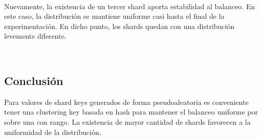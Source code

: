 ~

Nuevamente, la existencia de un tercer shard aporta estabilidad al balanceo. En este caso, la distribución
se mantiene uniforme casi hasta el final de la experimentación. En dicho punto, los shards quedan
con una distribución levemente diferente.

~

\subsection{Conclusión}

Para valores de shard keys generados de forma pseudoaleatoria es conveniente tener una clustering key
basada en hash para mantener el balanceo uniforme por sobre una con rango.
La existencia de mayor cantidad de shards favorecen a la uniformidad de la distribución.

